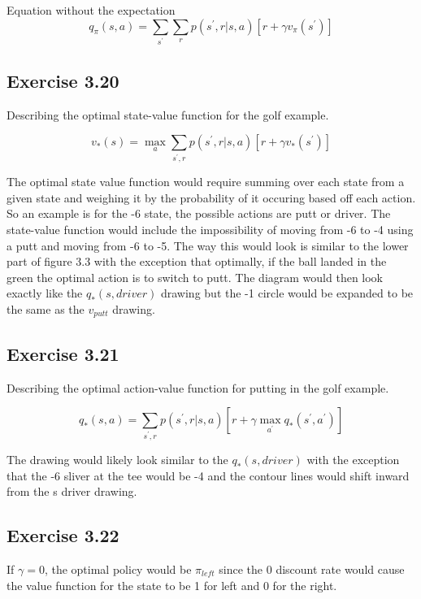 Equation without the expectation
\begin{equation}
  q_\pi(s,a) = \sum_{s^\prime} \sum_r p(s^\prime, r| s,a)[r+\gamma v_\pi(s^\prime)]
\end{equation}

\subsection{Exercise 3.20}
Describing the optimal state-value function for the golf example.

\begin{equation}
  v_*(s) = \max_a \sum_{s^\prime, r} p(s^\prime, r | s,a)[r + \gamma v_*(s^\prime)]
\end{equation}

The optimal state value function would require summing over each state from a given state and weighing it by the probability of it occuring based off each action. So an example is for the -6 state, the possible actions are putt or driver. The state-value function would include the impossibility of moving from -6 to -4 using a putt and moving from -6 to -5. The way this would look is similar to the lower part of figure 3.3 with the exception that optimally, if the ball landed in the green the optimal action is to switch to putt. The diagram would then look exactly like the $q_*(s,driver)$ drawing but the -1 circle would be expanded to be the same as the $v_{putt}$ drawing.

\subsection{Exercise 3.21}
Describing the optimal action-value function for putting in the golf example. 

\begin{equation}
  q_*(s,a) = \sum_{s^\prime, r} p(s^\prime, r | s,a)[r+\gamma \max_{a^\prime} q_*(s^\prime, a^\prime)]
\end{equation}

The drawing would likely look similar to the $q_*(s,driver)$ with the exception that the -6 sliver at the tee would be -4 and the contour lines would shift inward from the s driver drawing.

\subsection{Exercise 3.22}
If $\gamma = 0$, the optimal policy would be $\pi_{left}$ since the 0 discount rate would cause the value function for the state to be 1 for left and 0 for the right. 

